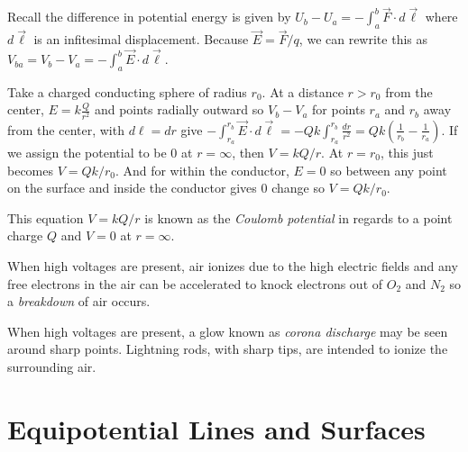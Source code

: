 \begin{remark}
    Recall the difference in potential energy is given by $U_b - U_a = -\int_a^b \vec{F}\cdot d \vec{\ell}$ where $d\vec{\ell}$ is an infitesimal displacement. Because $\vec{E} = \vec{F}/q$, we can rewrite this as $V_{ba} = V_b-V_a = -\int_a^b\vec{E}\cdot d\vec{\ell}.$
\end{remark}
\begin{example}
    Take a charged conducting sphere of radius $r_0$. At a distance $r>r_0$ from the center, $E = k\frac{Q}{r^2}$ and points radially outward so $V_b - V_a$ for points $r_a$ and $r_b$ away from the center, with $d\ell = dr$ give $-\int_{r_a}^{r_b}\vec{E}\cdot d\vec{\ell} = -Qk\int_{r_a}^{r_b}\frac{dr}{r^2} = Qk(\frac{1}{r_b}-\frac{1}{r_a}).$ If we assign the potential to be $0$ at $r=\infty$, then $V = kQ/r.$ At $r = r_0$, this just becomes $V = Qk/r_0.$ And for within the conductor, $E = 0$ so between any point on the surface and inside the conductor gives 0 change so $V = Qk/r_0.$
\end{example}
\begin{note}
    This equation $V = kQ/r$ is known as the \emph{Coulomb potential} in regards to a point charge $Q$ and $V = 0$ at $r = \infty$.
\end{note}
\begin{definition}[Breakdown]
    When high voltages are present, air ionizes due to the high electric fields and any free electrons in the air can be accelerated to knock electrons out of $O_2$ and $N_2$ so a \emph{breakdown} of air occurs.
\end{definition}
\begin{note}
    When high voltages are present, a glow known as \emph{corona discharge} may be seen around sharp points. Lightning rods, with sharp tips, are intended to ionize the surrounding air. 
\end{note}

\section{Equipotential Lines and Surfaces}

